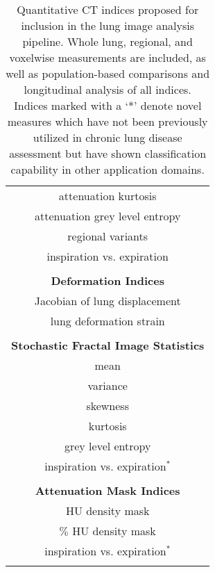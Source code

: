 \begin{table}[!t]
\begin{minipage}{0.33 \linewidth}
\begin{tabular}[t]{c}
    attenuation kurtosis  \\
    attenuation grey level entropy  \\
    regional variants  \\
    inspiration vs. expiration \\
    \\
    {\bf Deformation Indices}  {} \\
    \cmidrule[1pt](lr){1-1}
    Jacobian of lung displacement  \\
    lung deformation strain  \\
    \\
    {\bf Stochastic Fractal Image Statistics}\\
    \cmidrule[1pt](lr){1-1}
    mean  \\
    variance  \\
    skewness  \\
    kurtosis  \\
    grey level entropy  \\
    inspiration vs. expiration$^*$  \\
    \\
    {\bf Attenuation Mask Indices} \\
    \cmidrule[1pt](lr){1-1}
    HU density mask   \\
    $\%$ HU density mask  \\
    inspiration vs. expiration$^*$ \\
    \\
    \end{tabular}
   \end{minipage}
 \label{table:indices}
 \caption{Quantitative CT indices proposed for inclusion in the lung image analysis pipeline.  Whole lung, regional, and voxelwise measurements are included, as well as population-based comparisons and longitudinal analysis of all indices.  Indices marked with a `*' denote novel measures which have not been previously utilized in chronic lung disease assessment but have shown classification capability in other application domains.}
\end{table}
